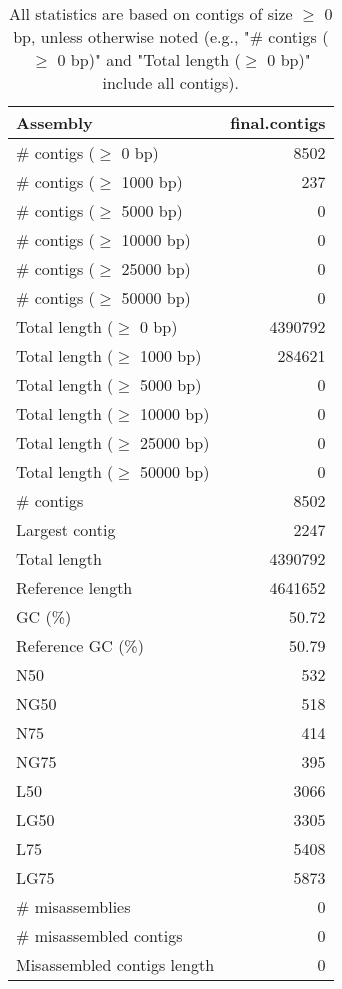 \documentclass[12pt,a4paper]{article}
\begin{document}
\begin{table}[ht]
\begin{center}
\caption{All statistics are based on contigs of size $\geq$ 0 bp, unless otherwise noted (e.g., "\# contigs ($\geq$ 0 bp)" and "Total length ($\geq$ 0 bp)" include all contigs).}
\begin{tabular}{|l*{1}{|r}|}
\hline
Assembly & final.contigs \\ \hline
\# contigs ($\geq$ 0 bp) & 8502 \\ \hline
\# contigs ($\geq$ 1000 bp) & 237 \\ \hline
\# contigs ($\geq$ 5000 bp) & 0 \\ \hline
\# contigs ($\geq$ 10000 bp) & 0 \\ \hline
\# contigs ($\geq$ 25000 bp) & 0 \\ \hline
\# contigs ($\geq$ 50000 bp) & 0 \\ \hline
Total length ($\geq$ 0 bp) & 4390792 \\ \hline
Total length ($\geq$ 1000 bp) & 284621 \\ \hline
Total length ($\geq$ 5000 bp) & 0 \\ \hline
Total length ($\geq$ 10000 bp) & 0 \\ \hline
Total length ($\geq$ 25000 bp) & 0 \\ \hline
Total length ($\geq$ 50000 bp) & 0 \\ \hline
\# contigs & 8502 \\ \hline
Largest contig & 2247 \\ \hline
Total length & 4390792 \\ \hline
Reference length & 4641652 \\ \hline
GC (\%) & 50.72 \\ \hline
Reference GC (\%) & 50.79 \\ \hline
N50 & 532 \\ \hline
NG50 & 518 \\ \hline
N75 & 414 \\ \hline
NG75 & 395 \\ \hline
L50 & 3066 \\ \hline
LG50 & 3305 \\ \hline
L75 & 5408 \\ \hline
LG75 & 5873 \\ \hline
\# misassemblies & 0 \\ \hline
\# misassembled contigs & 0 \\ \hline
Misassembled contigs length & 0 \\ \hline

\end{tabular}
\end{center}
\end{table}
\end{document}
